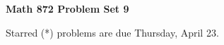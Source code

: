 \documentclass[12pt]{article}
\begin{document}
\def\ctln{\centerline}
\def\msk{\medskip}
\def\bsk{\bigskip}
\def\ssk{\smallskip}
\def\hsk{\hskip.3in}
\def\ra{\rightarrow}
\def\ubr{\underbar}

\def\mt{{\mathcal T}}
\def\mb{{\mathcal B}}
\def\ms{{\mathcal S}}
\def\mu{{\mathcal U}}
\def\mv{{\mathcal V}}

\def\bbr{{\mathbb R}}
\def\bbz{{\mathbb Z}}
\def\bbq{{\mathbb Q}}
\def\spc{$~$\hskip.15in$~$}

\def\sset{\subseteq}
\def\del{\partial}
\def\lra{$\Leftrightarrow$}
\def\bra{$\Rightarrow$}
\def\wtl{\widetilde}
\def\wtih{\widetilde{H}}


\ctln{\bf Math 872 Problem Set 9}

\msk

Starred (*) problems are due Thursday, April 23.
\end{document}
